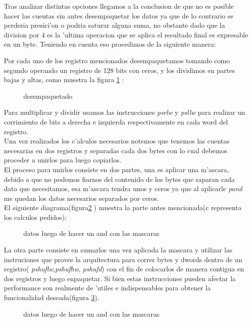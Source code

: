 Tras analizar distintas opciones llegamos a la conclusion de
que no es posible  hacer las cuentas sin antes desempaquetar los datos ya que de lo contrario se perderia
presici'on o  podria saturar alguna suma, no obstante dado que la division por 4 es la 'ultima operacion que 
se aplica el resultado final es expresable en un byte. Teniendo en cuenta eso procedimos de la siguiente 
manera: 

Por cada uno de los registro mencionados desempaquetamos tomando como segundo operando un registro de 128
bits con ceros, y los dividimos en partes bajas y altas, como muestra la figura \ref{est:m-tres} : 

\begin{figure}[hb]
\caption{desempaquetado}
\label{est:m-tres}
\end{figure}

Para multiplicar y dividir usamos las instrucciones \textit{psrlw} y \textit{psllw} para realizar un corrimiento 
de bits a derecha e izquierda respectivamente en cada word del registro. \\
Una vez realizados los c'alculos necesarios notemos que tenemos las cuentas necesarias en dos registros
y separadas cada dos bytes con lo cual debemos proceder a unirlos para luego copiarlos. \\
El proceso para unirlos consiste en dos partes, una es aplicar una m'ascara, debido a que no podemos 
fiarnos del contenido de los bytes que saparan cada dato que necesitamos, esa m'ascara tendra unos 
y ceros ya que al aplicarle \textit{pand} me quedan los datos necesarios separados por ceros.\\
El siguiente diagrama(figura\ref{est:m-cuatro} )  muestra la parte antes mencionada(c representa los calculos pedidos):
\begin{figure}[hb]
\caption{datos luego de hacer un and con las mascaras}
\label{est:m-cuatro}
\end{figure}
La otra parte consiste en sumarlos una vez aplicada la mascara y utilizar las instruciones que provee
la arquitectura para correr bytes y dwords dentro de un registro( \textit{pshuflw},\textit{pshufhw},
\textit{pshufd}) con el fin de colocarlos de manera contigua en dos registros y luego enpaquetar. Si bien 
estas instrucciones pueden afectar la performance son realmente de 'utiles e
indispensables para obtener la funcionalidad deseada(figura \ref{est:m-cinco}).
\begin{figure}[hb]
\caption{datos luego de hacer un and con las mascaras}
\label{est:m-cinco}
\end{figure}

